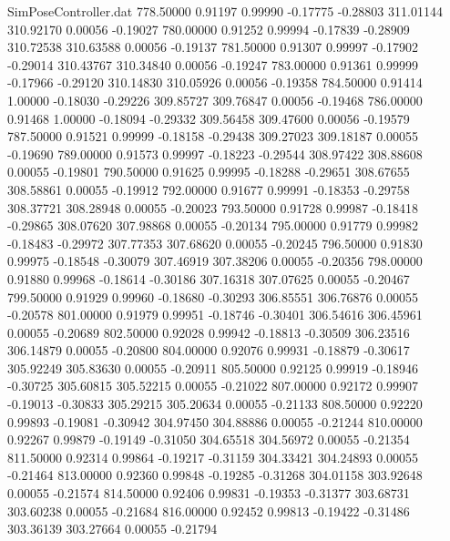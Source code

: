 \begin{filecontents}{SimPoseController.dat}
 778.50000    0.91197    0.99990    -0.17775   -0.28803  311.01144  310.92170    0.00056   -0.19027
 780.00000    0.91252    0.99994    -0.17839   -0.28909  310.72538  310.63588    0.00056   -0.19137
 781.50000    0.91307    0.99997    -0.17902   -0.29014  310.43767  310.34840    0.00056   -0.19247
 783.00000    0.91361    0.99999    -0.17966   -0.29120  310.14830  310.05926    0.00056   -0.19358
 784.50000    0.91414    1.00000    -0.18030   -0.29226  309.85727  309.76847    0.00056   -0.19468
 786.00000    0.91468    1.00000    -0.18094   -0.29332  309.56458  309.47600    0.00056   -0.19579
 787.50000    0.91521    0.99999    -0.18158   -0.29438  309.27023  309.18187    0.00055   -0.19690
 789.00000    0.91573    0.99997    -0.18223   -0.29544  308.97422  308.88608    0.00055   -0.19801
 790.50000    0.91625    0.99995    -0.18288   -0.29651  308.67655  308.58861    0.00055   -0.19912
 792.00000    0.91677    0.99991    -0.18353   -0.29758  308.37721  308.28948    0.00055   -0.20023
 793.50000    0.91728    0.99987    -0.18418   -0.29865  308.07620  307.98868    0.00055   -0.20134
 795.00000    0.91779    0.99982    -0.18483   -0.29972  307.77353  307.68620    0.00055   -0.20245
 796.50000    0.91830    0.99975    -0.18548   -0.30079  307.46919  307.38206    0.00055   -0.20356
 798.00000    0.91880    0.99968    -0.18614   -0.30186  307.16318  307.07625    0.00055   -0.20467
 799.50000    0.91929    0.99960    -0.18680   -0.30293  306.85551  306.76876    0.00055   -0.20578
 801.00000    0.91979    0.99951    -0.18746   -0.30401  306.54616  306.45961    0.00055   -0.20689
 802.50000    0.92028    0.99942    -0.18813   -0.30509  306.23516  306.14879    0.00055   -0.20800
 804.00000    0.92076    0.99931    -0.18879   -0.30617  305.92249  305.83630    0.00055   -0.20911
 805.50000    0.92125    0.99919    -0.18946   -0.30725  305.60815  305.52215    0.00055   -0.21022
 807.00000    0.92172    0.99907    -0.19013   -0.30833  305.29215  305.20634    0.00055   -0.21133
 808.50000    0.92220    0.99893    -0.19081   -0.30942  304.97450  304.88886    0.00055   -0.21244
 810.00000    0.92267    0.99879    -0.19149   -0.31050  304.65518  304.56972    0.00055   -0.21354
 811.50000    0.92314    0.99864    -0.19217   -0.31159  304.33421  304.24893    0.00055   -0.21464
 813.00000    0.92360    0.99848    -0.19285   -0.31268  304.01158  303.92648    0.00055   -0.21574
 814.50000    0.92406    0.99831    -0.19353   -0.31377  303.68731  303.60238    0.00055   -0.21684
 816.00000    0.92452    0.99813    -0.19422   -0.31486  303.36139  303.27664    0.00055   -0.21794

\end{filecontents}
